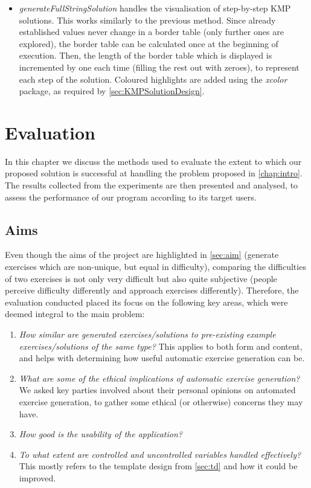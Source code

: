 \documentclass{l4proj}
\begin{document}
\begin{itemize}
	\item
	\emph{generateFullStringSolution} handles the visualisation of step-by-step KMP solutions. This works similarly to the previous method. Since already established values never change in a border table (only further ones are explored), the border table can be calculated once at the beginning of execution. Then, the length of the border table which is displayed is incremented by one each time (filling the rest out with zeroes), to represent each step of the solution. Coloured highlights are added using the \emph{xcolor} package, as required by \autoref{sec:KMPSolutionDesign}.
\end{itemize}

\chapter{Evaluation} 
\label{chap:ev}

In this chapter we discuss the methods used to evaluate the extent to which our proposed solution is successful at handling the problem proposed in \autoref{chap:intro}. The results collected from the experiments are then presented and 	analysed, to assess the performance of our program according to its target users.

\section{Aims}
\label{sec:evalAims}

Even though the aims of the project are highlighted in \autoref{sec:aim} (generate exercises which are non-unique, but equal in difficulty), comparing the difficulties of two exercises is not only very difficult but also quite subjective (people perceive difficulty differently and approach exercises differently). Therefore, the evaluation conducted placed its focus on the following key areas, which were deemed integral to the main problem:

\begin{enumerate}
	\item
	\emph{How similar are generated exercises/solutions to pre-existing example exercises/solutions of the same type?} This applies to both form and content, and helps with determining how useful automatic exercise generation can be.
	\item
	\emph{What are some of the ethical implications of automatic exercise generation?} We asked key parties involved about their personal opinions on automated exercise generation, to gather some ethical (or otherwise) concerns they may have.
	\item
	\emph{How good is the usability of the application?} 
	\item
	\emph{To what extent are controlled and uncontrolled variables handled effectively?} This mostly refers to the template design from \autoref{sec:td} and how it could be improved.
\end{enumerate}
\end{document}
